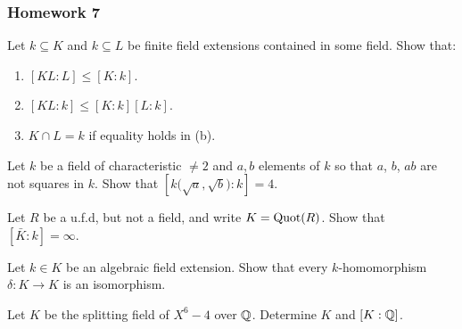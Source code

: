\subsubsection{Homework 7}
\setcounter{exercise}{0}
\setcounter{equation}{0}

\begin{problem}
  Let \(k\subseteq K\) and \(k\subseteq L\) be finite field extensions
  contained in some field. Show that:
  \begin{enumerate}[label=(\alph*)]
  \item \([KL:L]\leq[K:k]\).
  \item \([KL:k]\leq[K:k][L:k]\).
  \item \(K\cap L=k\) if equality holds in (b).
  \end{enumerate}
\end{problem}
\begin{solution}
\end{solution}

\begin{problem}
  Let \(k\) be a field of characteristic \(\neq 2\) and \(a,b\) elements of
  \(k\) so that \(a\), \(b\), \(ab\) are not squares in \(k\). Show that
  \(\left[k{\bigl(\sqrt{a},\sqrt{b}\bigr)}:k\right]=4\).
\end{problem}
\begin{solution}
\end{solution}

\begin{problem}
  Let \(R\) be a u.f.d, but not a field, and write \( K=\operatorname{Quot}(R)\). Show
  that \([\bar K:k]=\infty\).
\end{problem}
\begin{solution}
\end{solution}

\begin{problem}
  Let \(k\in K\) be an algebraic field extension. Show that every
  \(k\)-homomorphism \(\delta\colon K\to K\) is an isomorphism.
\end{problem}
\begin{solution}
\end{solution}

\begin{problem}
  Let \(K\) be the splitting field of \(X^6-4\) over \(\mathbb{Q}\). Determine
  \(K\) and \([K:\mathbb{Q}]\).
\end{problem}
\begin{solution}
\end{solution}

